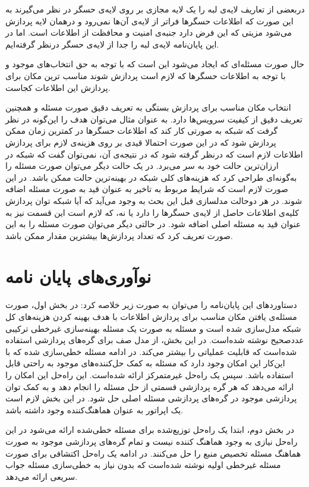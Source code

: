   دربعضی از تعاریف لایه‌ی لبه را یک لایه مجازی بر روی لایه‌ی حسگر در نظر می‌گیرند به این صورت که اطلاعات حسگرها فراتر از لایه‌ی آن‌ها نمی‌رود و درهمان لایه پردازش می‌شود مزیتی که این فرض دارد جنبه‌ی امنیت و محافظت از اطلاعات است. اما در این پایان‌نامه لایه‌ی لبه را جدا از لایه‌ی  حسگر درنظر گرفته‌ایم. 
   
  حال صورت مسئله‌ای که ایجاد می‌شود این است که با توجه به حق انتخاب‌های موجود و با توجه به اطلاعات حسگرها که لازم است پردازش شوند مناسب ترین مکان برای پردازش این اطلاعات کجاست.
 
  انتخاب مکان مناسب برای پردازش بستگی به تعریف دقیق صورت مسئله و همچنین تعریف دقیق از کیفیت سرویس‌ها دارد. به عنوان مثال می‌توان هدف را این‌گونه در نظر گرفت که شبکه به صورتی کار کند که اطلاعات حسگرها در کمترین زمان ممکن پردازش شود که در این صورت احتمالا قیدی بر روی هزینه‌ی لازم برای پردازش اطلاعات لازم است که درنظر گرفته شود که در نتیجه‌ی آن، نمی‌توان گفت که شبکه در ارزان‌ترین حالت خود به سر می‌برد.
  در یک حالت دیگر می‌توان صورت مسئله را به‌گونه‌ای طراحی کرد که هزینه‌های کلی شبکه در بهینه‌ترین حالت ممکن باشد. در این صورت لازم است که شرایط مربوط به تاخیر به عنوان قید به صورت مسئله اضافه شوند. در هر دوحالت مدلسازی قبل این بحث به وجود می‌آید که آیا شبکه توان پردازش کلیه‌ی اطلاعات حاصل از لایه‌ی حسگرها را دارد یا نه، که لازم است این قسمت نیز به عنوان قید به مسئله اصلی اضافه شود.  در حالتی دیگر می‌توان صورت مسئله را به این صورت تعریف کرد که تعداد پردازش‌ها بیشترین مقدار ممکن باشد. 

  \section{نو‌آوری‌های پایان نامه}
    دستاورد‌های این پایان‌نامه را می‌توان به صورت زیر خلاصه کرد:
    در بخش اول، صورت مسئله‌ی یافتن مکان مناسب برای پردازش اطلاعات با هدف بهینه کردن هزینه‌های کل شبکه مدل‌سازی شده است و مسئله به صورت یک مسئله بهینه‌سازی غیرخطی ترکیبی عددصحیح نوشته شده‌است.
    در این بخش، از مدل صف برای گره‌های پردازشی استفاده شده‌است که قابلیت عملیاتی را بیشتر می‌کند. در ادامه مسئله خطی‌سازی شده که با این‌کار این امکان وجود دارد که مسئله به کمک حل‌کننده‌های موجود به راحتی قابل استفاده باشد. سپس یک راه‌حل غیرمتمرکز ارائه شده‌است. این راه‌حل این امکان را ارائه می‌دهد که هر گره پردازشی قسمتی از حل مسئله را انجام دهد و به کمک توان پردازشی موجود در گره‌های پردازشی مسئله اصلی حل شود. در این بخش لازم است یک اپراتور به عنوان هماهنگ‌کننده وجود داشته باشد. 

    در بخش دوم، ابتدا یک راه‌حل توزیع‌شده برای مسئله خطی‌شده ارائه می‌شود در این راه‌حل نیازی به وجود هماهنگ کننده نیست و تمام گره‌های پردازشی موجود به صورت هماهنگ مسئله تخصیص منبع را حل می‌کنند. در ادامه یک راه‌حل اکتشافی برای صورت مسئله غیرخطی اولیه نوشته شده‌است که بدون نیاز به خطی‌سازی مسئله جواب سریعی ارائه می‌دهد. 


